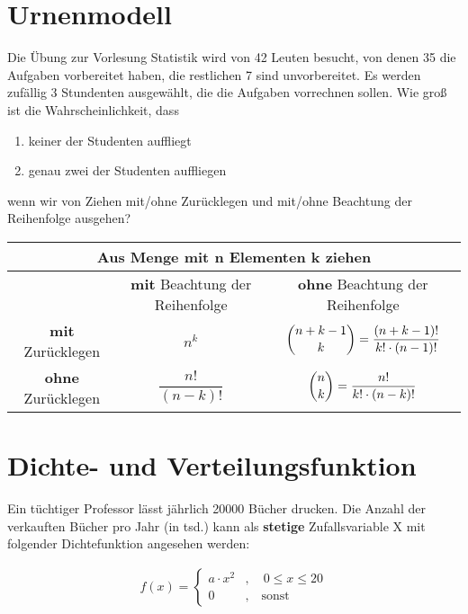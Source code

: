 \documentclass[11pt, a4paper]{article}
\begin{document}
\newpage
\section{Urnenmodell}

Die Übung zur Vorlesung Statistik wird von 42 Leuten besucht, von denen 35 die Aufgaben vorbereitet haben, die restlichen 7 sind unvorbereitet. Es werden zufällig 3 Stundenten ausgewählt, die die Aufgaben vorrechnen sollen. Wie groß ist die Wahrscheinlichkeit, dass
\begin{enumerate}
	\item keiner der Studenten auffliegt
	\item genau zwei der Studenten auffliegen
\end{enumerate}
wenn wir von Ziehen mit/ohne Zurücklegen und mit/ohne Beachtung der Reihenfolge ausgehen?

\vspace{\baselineskip}
\begin{tabular}{|c||c|c|}
	\hline
	\multicolumn{3}{|c|}{Aus Menge mit \textbf{n} Elementen \textbf{k} ziehen} \\
	\hline
	 & \textbf{mit} Beachtung der Reihenfolge & \textbf{ohne} Beachtung der Reihenfolge \\
	\hline \hline
	\textbf{mit} Zurücklegen & $n^k$ & $\dbinom{n+k-1}{k} = \dfrac{(n+k-1)!}{k!\cdot (n-1)!}$ \\
	\hline
	\textbf{ohne} Zurücklegen & $\dfrac{n!}{(n-k)!}$ & $\dbinom{n}{k} = \dfrac{n!}{k!\cdot (n-k)!}$ \\
\hline
\end{tabular}

\newpage
\section{Dichte- und Verteilungsfunktion}

Ein tüchtiger Professor lässt jährlich 20000 Bücher drucken. Die Anzahl der verkauften Bücher pro Jahr (in tsd.) kann als \textbf{stetige} Zufallsvariable X mit folgender Dichtefunktion angesehen werden:

\begin{align*}
f(x) = \begin{cases}a \cdot x^2 & , \quad 0 \leq x \leq 20\\ 0 & , \quad \text{sonst}\end{cases}
\end{align*}
\end{document}

